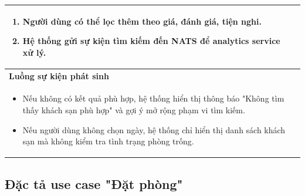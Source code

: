 \documentclass[13pt,a4paper,twoside]{report}
\begin{document}
\begin{longtable}{p{3.5cm} p{11.5cm}}
{\begin{enumerate}[nosep]
      \item Người dùng có thể lọc thêm theo giá, đánh giá, tiện nghi.
      \item Hệ thống gửi sự kiện tìm kiếm đến NATS để analytics service xử lý.
    \end{enumerate}
  } \\
  \midrule
  \multicolumn{2}{p{15cm}}{\textbf{Luồng sự kiện phát sinh}} \\
  \midrule
  \multicolumn{2}{p{15cm}}{%
    \begin{itemize}[nosep]
      \item Nếu không có kết quả phù hợp, hệ thống hiển thị thông báo "Không tìm thấy khách sạn phù hợp" và gợi ý mở rộng phạm vi tìm kiếm.
      \item Nếu người dùng không chọn ngày, hệ thống chỉ hiển thị danh sách khách sạn mà không kiểm tra tình trạng phòng trống.
    \end{itemize}
  } \\
  \bottomrule
\end{longtable}

\subsection{Đặc tả use case "Đặt phòng"}
\end{document}
